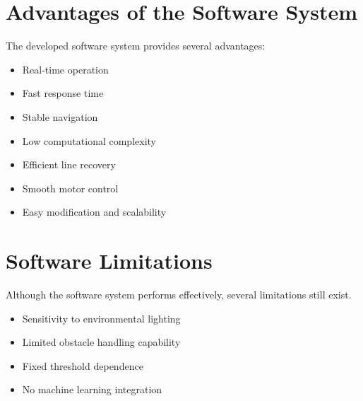 \documentclass[12pt,a4paper,oneside]{report}
\begin{document}

\section{Advantages of the Software System}

The developed software system provides several advantages:

\begin{itemize}

\item Real-time operation

\item Fast response time

\item Stable navigation

\item Low computational complexity

\item Efficient line recovery

\item Smooth motor control

\item Easy modification and scalability

\end{itemize}


\section{Software Limitations}

Although the software system performs effectively, several limitations still exist.

\begin{itemize}

\item Sensitivity to environmental lighting

\item Limited obstacle handling capability

\item Fixed threshold dependence

\item No machine learning integration

\end{itemize}
\end{document}
